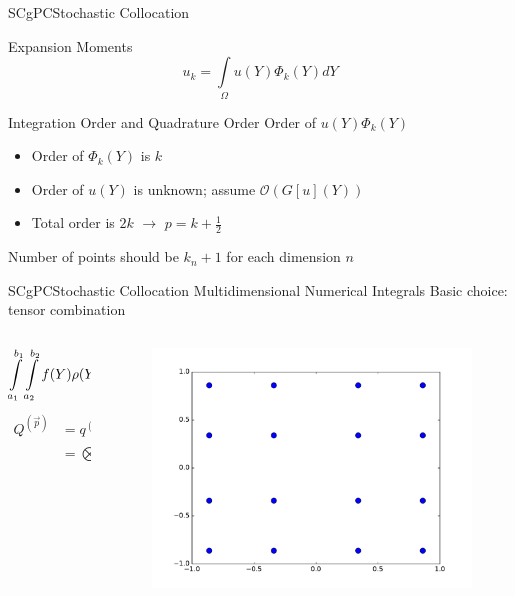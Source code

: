 \documentclass{beamer}
\begin{document}
\begin{frame}{SCgPC}{Stochastic Collocation}\vspace{-20pt}
  \begin{alertblock}{Expansion Moments}
    \[u_k = \int\limits_\Omega u(Y)\Phi_k(Y) dY\]
  \end{alertblock}
  Integration Order and Quadrature Order
  Order of $u(Y)\Phi_k(Y)$
  \begin{itemize}
    \item Order of $\Phi_k(Y)$ is $k$
    \item Order of $u(Y)$ is unknown; assume $\mathcal{O}(G[u](Y))$
    \item Total order is $2k$ $\to$ $p = k+\frac{1}{2}$
  \end{itemize}
  Number of points should be $k_n+1$ for each dimension $n$
\end{frame}


\begin{frame}{SCgPC}{Stochastic Collocation}\vspace{-20pt}
  Multidimensional Numerical Integrals
  \vfill
  Basic choice: tensor combination
  \begin{columns}
    \begin{column}{0.6\textwidth}
      \begin{equation*}
        \int\limits_{a_1}^{b_1}\int\limits_{a_2}^{b_2} f(Y) \rho(Y)\ dy_2\ dy_1 \approx Q^{(\vec p)}\qty[f(Y)]
      \end{equation*}
      \begin{align*}
        Q^{(\vec p)} &= q^{(p_1)} \otimes q^{(p_2)} \\
          &= \bigotimes_{n=1}^N q^{(p_n)}
      \end{align*}
    \end{column}
    \begin{column}{0.4\textwidth}
    \begin{figure}[h!]
      \centering
      \includegraphics[width=\linewidth]{tensor_quad}
    \end{figure}
    \end{column}
  \end{columns}
\end{frame}
\end{document}
